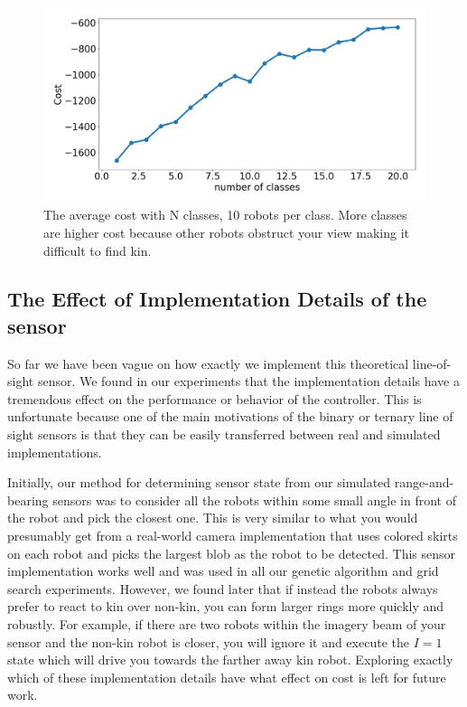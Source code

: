 \documentclass[conference]{IEEEtran}
\begin{document}
    \begin{figure}[H]
      \centering
      \includegraphics[width=1\linewidth]{./images/num_classes_vs_cost_10_per_class.png}
      \caption{The average cost with N classes, 10 robots per class. More classes are higher cost because other robots obstruct your view making it difficult to find kin.}
      \label{fig:num_classes_10}
    \end{figure}

  \subsection{The Effect of Implementation Details of the sensor} \label{section:sensor_impl}

    So far we have been vague on how exactly we implement this theoretical line-of-sight sensor. We found in our experiments that the implementation details have a tremendous effect on the performance or behavior of the controller. This is unfortunate because one of the main motivations of the binary or ternary line of sight sensors is that they can be easily transferred between real and simulated implementations.

    Initially, our method for determining sensor state from our simulated range-and-bearing sensors was to consider all the robots within some small angle in front of the robot and pick the closest one. This is very similar to what you would presumably get from a real-world camera implementation that uses colored skirts on each robot and picks the largest blob as the robot to be detected. This sensor implementation works well and was used in all our genetic algorithm and grid search experiments. However, we found later that if instead the robots always prefer to react to kin over non-kin, you can form larger rings more quickly and robustly. For example, if there are two robots within the imagery beam of your sensor and the non-kin robot is closer, you will ignore it and execute the $I=1$ state which will drive you towards the farther away kin robot. Exploring exactly which of these implementation details have what effect on cost is left for future work.
\end{document}
